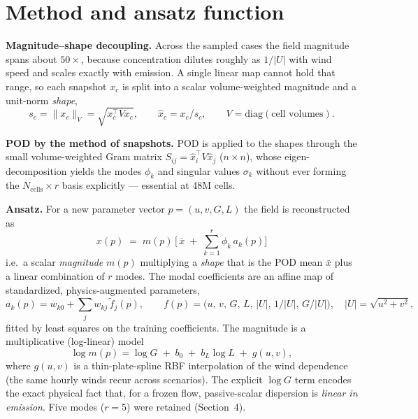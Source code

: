 \documentclass[11pt]{article}
\begin{document}
\section{Method and ansatz function}
\textbf{Magnitude--shape decoupling.} Across the sampled cases the field magnitude spans about
$50\times$, because concentration dilutes roughly as $1/|U|$ with wind speed and scales exactly
with emission. A single linear map cannot hold that range, so each snapshot $x_c$ is split into a
scalar volume-weighted magnitude and a unit-norm \emph{shape},
\begin{equation}
s_c = \lVert x_c\rVert_V = \sqrt{x_c^{\!\top} V x_c}, \qquad
\hat{x}_c = x_c / s_c , \qquad V=\mathrm{diag}(\text{cell volumes}).
\end{equation}

\textbf{POD by the method of snapshots.} POD is applied to the shapes through the small
volume-weighted Gram matrix $S_{ij}=\hat{x}_i^{\!\top} V \hat{x}_j$ ($n\times n$), whose
eigen-decomposition yields the modes $\phi_k$ and singular values $\sigma_k$ without ever forming
the $N_{\text{cells}}\times r$ basis explicitly --- essential at 48M cells.

\textbf{Ansatz.} For a new parameter vector $p=(u,v,G,L)$ the field is reconstructed as
\begin{equation}
\boxed{\;x(p) \;=\; m(p)\,\Big[\,\bar{x} \;+\; \sum_{k=1}^{r}\phi_k\,a_k(p)\Big]\;}
\end{equation}
i.e.\ a scalar \emph{magnitude} $m(p)$ multiplying a \emph{shape} that is the POD mean $\bar{x}$
plus a linear combination of $r$ modes. The modal coefficients are an affine map of standardized,
physics-augmented parameters,
\begin{equation}
a_k(p) = w_{k0} + \sum_j w_{kj}\,\tilde{f}_j(p),\qquad
f(p)=\big(u,\,v,\,G,\,L,\,|U|,\,1/|U|,\,G/|U|\big),\quad |U|=\sqrt{u^2+v^2},
\end{equation}
fitted by least squares on the training coefficients. The magnitude is a multiplicative
(log-linear) model
\begin{equation}
\log m(p) = \log G \;+\; b_0 \;+\; b_L\log L \;+\; g(u,v),
\end{equation}
where $g(u,v)$ is a thin-plate-spline RBF interpolation of the wind dependence (the same hourly
winds recur across scenarios). The explicit $\log G$ term encodes the exact physical fact that,
for a frozen flow, passive-scalar dispersion is \emph{linear in emission}. Five modes ($r=5$) were
retained (Section~4).
\end{document}
